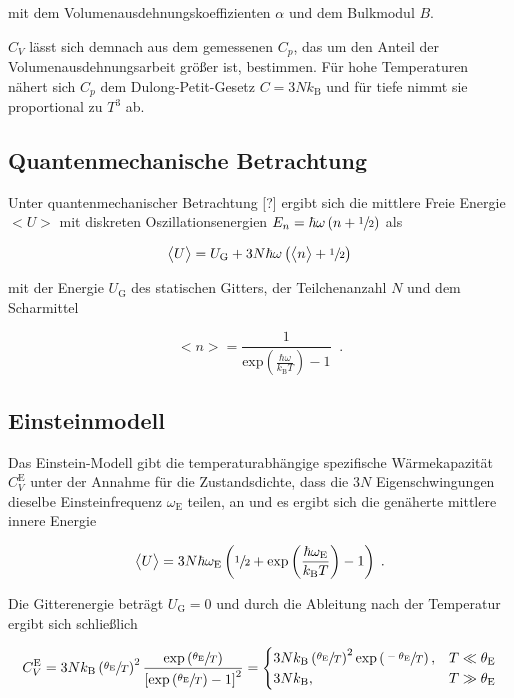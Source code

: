 mit dem Volumenausdehnungskoeffizienten $\alpha$ und dem Bulkmodul $B$.

$C_V$ lässt sich demnach aus dem gemessenen $C_p$, das um den Anteil der Volumenausdehnungsarbeit größer ist, bestimmen.
Für hohe Temperaturen nähert sich $C_p$ dem Dulong-Petit-Gesetz $C = 3 N k_\text{B}$ und für tiefe nimmt sie proportional
zu $T^3$ ab.

\subsection{Quantenmechanische Betrachtung}

Unter quantenmechanischer Betrachtung [?] ergibt sich die mittlere Freie Energie $\bigl<U\bigr>$ mit diskreten
Oszillationsenergien $E_n = \hbar \omega \left(n + \sfrac{1}{2}\right)$ als

\begin{equation}
    \bigl<U\bigr> = U_\text{G} + 3N \hbar\omega \left(\bigl<n\bigr> + \sfrac{1}{2} \right) 
\end{equation}

mit der Energie $U_\text{G}$ des statischen Gitters, der Teilchenanzahl $N$ und dem Scharmittel

\begin{equation}
    \bigl<n\bigr> = \frac{1}{\text{exp}\left(\frac{\hbar \omega}{k_\text{B}T}\right)-1} \; \; .
\end{equation}

\subsection{Einsteinmodell}

Das Einstein-Modell gibt die temperaturabhängige spezifische Wärmekapazität $C_V^\text{E}$ unter der Annahme für die Zustandsdichte,
dass die $3N$ Eigenschwingungen dieselbe Einsteinfrequenz $\omega_\text{E}$ teilen, an und es ergibt sich die genäherte 
mittlere innere Energie

\begin{equation}
    \bigl<U\bigr> = 3N \hbar\omega_\text{E} \left(\sfrac{1}{2} + \text{exp}\left(\frac{\hbar \omega_\text{E}}{k_\text{B}T}\right)
     - 1\right) \; .
\end{equation}

Die  Gitterenergie beträgt $U_\text{G} = 0$ und durch die Ableitung nach der Temperatur ergibt sich schließlich

\begin{equation}
    C_V^\text{E} = 3Nk_\text{B} \left(\sfrac{\theta_\text{E}}{T}\right)^2 \frac{\text{exp}\left(\sfrac{\theta_\text{E}}{T}\right)}
    {\left[\text{exp}\left(\sfrac{\theta_\text{E}}{T}\right) - 1\right]^2} = 
    \begin{cases}
        3Nk_\text{B} \left(\sfrac{\theta_\text{E}}{T}\right)^2 \text{exp}\left(\sfrac{-\theta_\text{E}}{T}\right), 
        & T \ll \theta_\text{E} \\
        3Nk_\text{B} , & T \gg \theta_\text{E}
    \end{cases}
\end{equation}

